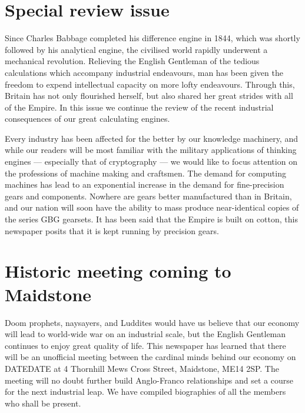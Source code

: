 \section{Special review issue}\label{special-review-issue}

Since Charles Babbage completed his difference engine in 1844, which was
shortly followed by his analytical engine, the civilised world rapidly
underwent a mechanical revolution. Relieving the English Gentleman of
the tedious calculations which accompany industrial endeavours, man has
been given the freedom to expend intellectual capacity on more lofty
endeavours. Through this, Britain has not only flourished herself, but
also shared her great strides with all of the Empire. In this issue we
continue the review of the recent industrial consequences of our great
calculating engines.

Every industry has been affected for the better by our knowledge
machinery, and while our readers will be most familiar with the military
applications of thinking engines --- especially that of cryptography ---
we would like to focus attention on the professions of machine making
and craftsmen. The demand for computing machines has lead to an
exponential increase in the demand for fine-precision gears and
components. Nowhere are gears better manufactured than in Britain, and
our nation will soon have the ability to mass produce near-identical
copies of the series GBG gearsets. It has been said that the Empire is
built on cotton, this newspaper posits that it is kept running by
precision gears.

\section{Historic meeting coming to
Maidstone}\label{historic-meeting-coming-to-maidstone}

Doom prophets, naysayers, and Luddites would have us believe that our
economy will lead to world-wide war on an industrial scale, but the
English Gentleman continues to enjoy great quality of life. This
newspaper has learned that there will be an unofficial meeting between
the cardinal minds behind our economy on DATEDATE at 4 Thornhill Mews
Cross Street, Maidstone, ME14 2SP. The meeting will no doubt further
build Anglo-Franco relationships and set a course for the next
industrial leap. We have compiled biographies of all the members who
shall be present.

